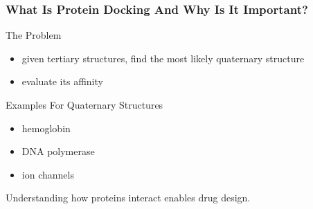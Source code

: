 \documentclass{beamer}
\begin{document}

\begin{frame}
\frametitle{What Is Protein Docking And Why Is It Important?}
\begin{block}{The Problem}
\begin{itemize}
	\item given tertiary structures, find the most likely quaternary structure
	\item evaluate its affinity
\end{itemize}
\end{block}

\begin{block}{Examples For Quaternary Structures}
\begin{itemize}
	\item hemoglobin
	\item DNA polymerase
	\item ion channels
\end{itemize}
Understanding how proteins interact enables drug design.
\end{block}
\end{frame}

\end{document}

